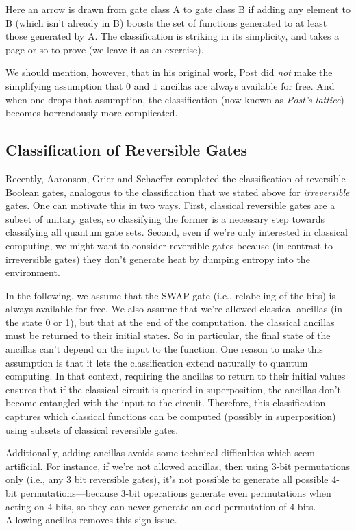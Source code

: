 \documentclass[12pt]{report}
\theoremstyle{plain}
\theoremstyle{definition}
\begin{document}
Here an arrow is drawn from gate class A to gate class B if adding any element to B (which isn't already in B) boosts the set of functions generated to at least those generated by A.  The classification is striking in its simplicity, and takes a page or so to prove (we leave it as an exercise).

We should mention, however, that in his original work, Post did {\em not} make the simplifying assumption that $0$ and $1$ ancillas are always available for free.  And when one drops that assumption, the classification (now known as {\em Post's lattice}) becomes horrendously more complicated.

\subsection{Classification of Reversible Gates} \label{REV}

Recently, Aaronson, Grier and Schaeffer \cite{ReversibleGates} completed the classification of reversible Boolean gates, analogous to the classification that we stated above for {\em irreversible} gates.  One can motivate this in two ways.  First, classical reversible gates are a subset of unitary gates, so classifying the former is a necessary step towards classifying all quantum gate sets. Second, even if we're only interested in classical computing, we might want to consider reversible gates because (in contrast to irreversible gates) they don't generate heat by dumping entropy into the environment.

In the following, we assume that the SWAP gate (i.e., relabeling of the bits) is always available for free.  We also assume that we're allowed classical ancillas (in the state 0 or 1), but that at the end of the computation, the classical ancillas must be returned to their initial states. So in particular, the final state of the ancillas can't depend on the input to the function. One reason to make this assumption is that it lets the classification extend naturally to quantum computing. In that context, requiring the ancillas to return to their initial values ensures that if the classical circuit is queried in superposition, the ancillas don't become entangled with the input to the circuit. Therefore, this classification captures which classical functions can be computed (possibly in superposition) using subsets of classical reversible gates.

Additionally, adding ancillas avoids some technical difficulties which seem artificial. For instance, if we're not allowed ancillas, then using 3-bit permutations only (i.e., any 3 bit reversible gates), it's not possible to generate all possible 4-bit permutations---because 3-bit operations generate even permutations when acting on 4 bits, so they can never generate an odd permutation of 4 bits. Allowing ancillas removes this sign issue.
\end{document}
